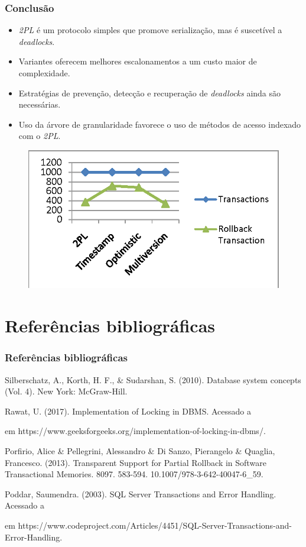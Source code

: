 \documentclass{beamer}
\begin{document}
\begin{frame} %
    \frametitle{Conclusão}
    \begin{itemize}
        \item \emph{2PL} é um protocolo simples que promove serialização, mas é suscetível a \emph{deadlocks}.
        \item Variantes oferecem melhores escalonamentos a um custo maior de complexidade.
        \item Estratégias de prevenção, detecção e recuperação de \emph{deadlocks} ainda são necessárias.
        \item Uso da árvore de granularidade favorece o uso de métodos de acesso indexado com o \emph{2PL}.
    \end{itemize}

    \begin{figure}
        \includegraphics[width=0.53\linewidth]{conclusion.png}
    \end{figure}
\end{frame}


\section{Referências bibliográficas}

\begin{frame} %
    \frametitle{Referências bibliográficas}
    \footnotesize{
    \begin{thebibliography}{99} %
        Silberschatz, A., Korth, H. F., \& Sudarshan, S. (2010). Database system concepts (Vol. 4). New York: McGraw-Hill.

        Rawat, U. (2017). Implementation of Locking in DBMS. Acessado a \date{25/11/2018} em https://www.geeksforgeeks.org/implementation-of-locking-in-dbms/.

        Porfirio, Alice \& Pellegrini, Alessandro \& Di Sanzo, Pierangelo \& Quaglia, Francesco. (2013). Transparent Support for Partial Rollback in Software Transactional Memories. 8097. 583-594. 10.1007/978-3-642-40047-6\_59. 

        Poddar, Saumendra. (2003). SQL Server Transactions and Error Handling. Acessado a \date{25/11/2018} em https://www.codeproject.com/Articles/4451/SQL-Server-Transactions-and-Error-Handling.
    \end{thebibliography}
    }
\end{frame}
\end{document}
